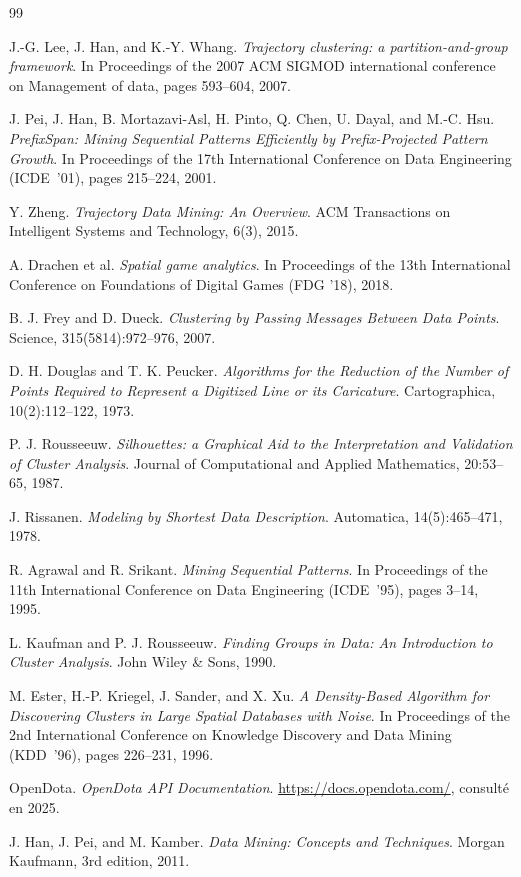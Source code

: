 \documentclass[11pt, a4paper]{article}
\begin{document}
\begin{thebibliography}{99}

J.-G. Lee, J. Han, and K.-Y. Whang. 
\textit{Trajectory clustering: a partition-and-group framework}. 
In Proceedings of the 2007 ACM SIGMOD international conference on Management of data, pages 593--604, 2007.

J. Pei, J. Han, B. Mortazavi-Asl, H. Pinto, Q. Chen, U. Dayal, and M.-C. Hsu.
\textit{PrefixSpan: Mining Sequential Patterns Efficiently by Prefix-Projected Pattern Growth}. 
In Proceedings of the 17th International Conference on Data Engineering (ICDE~'01), pages 215--224, 2001.

Y. Zheng. 
\textit{Trajectory Data Mining: An Overview}. 
ACM Transactions on Intelligent Systems and Technology, 6(3), 2015.

A. Drachen et al. 
\textit{Spatial game analytics}. 
In Proceedings of the 13th International Conference on Foundations of Digital Games (FDG '18), 2018.

B. J. Frey and D. Dueck.
\textit{Clustering by Passing Messages Between Data Points}.
Science, 315(5814):972--976, 2007.

D. H. Douglas and T. K. Peucker.
\textit{Algorithms for the Reduction of the Number of Points Required to Represent a Digitized Line or its Caricature}.
Cartographica, 10(2):112--122, 1973.

P. J. Rousseeuw.
\textit{Silhouettes: a Graphical Aid to the Interpretation and Validation of Cluster Analysis}.
Journal of Computational and Applied Mathematics, 20:53--65, 1987.

J. Rissanen.
\textit{Modeling by Shortest Data Description}.
Automatica, 14(5):465--471, 1978.

R. Agrawal and R. Srikant.
\textit{Mining Sequential Patterns}.
In Proceedings of the 11th International Conference on Data Engineering (ICDE~'95), pages 3--14, 1995.

L. Kaufman and P. J. Rousseeuw.
\textit{Finding Groups in Data: An Introduction to Cluster Analysis}.
John Wiley \& Sons, 1990.

M. Ester, H.-P. Kriegel, J. Sander, and X. Xu.
\textit{A Density-Based Algorithm for Discovering Clusters in Large Spatial Databases with Noise}.
In Proceedings of the 2nd International Conference on Knowledge Discovery and Data Mining (KDD~'96), pages 226--231, 1996.

OpenDota.
\textit{OpenDota API Documentation}.
\url{https://docs.opendota.com/}, consulté en 2025.

J. Han, J. Pei, and M. Kamber.
\textit{Data Mining: Concepts and Techniques}.
Morgan Kaufmann, 3rd edition, 2011.

\end{thebibliography}
\end{document}
